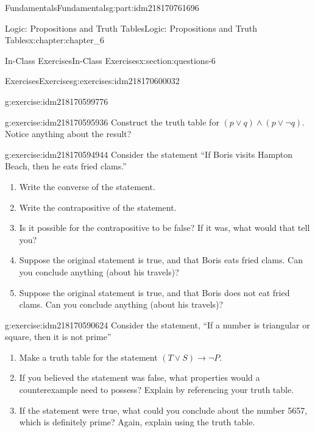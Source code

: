 \documentclass[oneside,10pt,]{book}
\numberwithin{equation}{section}
\begin{document}
\begin{partptx}{Fundamentals}{}{Fundamentals}{}{}{g:part:idm218170761696}
\begin{chapterptx}{Logic: Propositions and Truth Tables}{}{Logic: Propositions and Truth Tables}{}{}{x:chapter:chapter_6}
\begin{sectionptx}{In-Class Exercises}{}{In-Class Exercises}{}{}{x:section:questions-6}
\begin{exercises-subsection-numberless}{Exercises}{}{Exercises}{}{}{g:exercises:idm218170600032}
\begin{exercisegroup}
\begin{divisionexerciseeg}{1}{}{}{g:exercise:idm218170599776}
%
\end{divisionexerciseeg}%
\begin{divisionexerciseeg}{2}{}{}{g:exercise:idm218170595936}%
Construct the truth table for \((p \lor q) \land (p\lor \neg q)\).   Notice anything about the result?%
\end{divisionexerciseeg}%
\begin{divisionexerciseeg}{3}{}{}{g:exercise:idm218170594944}%
Consider the statement “If Boris visits Hampton Beach, then he eats fried clams.”%
\begin{enumerate}[label=(\alph*)]
\item{}Write the converse of the statement.%
\item{}Write the contrapositive of the statement.%
\item{}Is it possible for the contrapositive to be false? If it was, what would that tell you?%
\item{}Suppose the original statement is true, and that Boris eats fried clams. Can you conclude anything (about his travels)?%
\item{}Suppose the original statement is true, and that Boris does not eat fried clams. Can you conclude anything (about his travels)?%
\end{enumerate}
%
\end{divisionexerciseeg}%
\begin{divisionexerciseeg}{4}{}{}{g:exercise:idm218170590624}%
Consider the statement, ``If a number is triangular or square, then it is not prime''%
\begin{enumerate}[label=(\alph*)]
\item{}Make a truth table for the statement \((T \vee S) \rightarrow \neg P\).%
\item{}If you believed the statement was false, what properties would a counterexample need to possess? Explain by referencing your truth table.%
\item{}If the statement were true, what could you conclude about the number 5657, which is definitely prime? Again, explain using the truth table.%
\end{enumerate}
%
\end{divisionexerciseeg}%
\end{exercisegroup}
\par\medskip\noindent
\end{exercises-subsection-numberless}
\end{sectionptx}
\end{chapterptx}
%
\typeout{************************************************}

\end{partptx}
\end{document}
